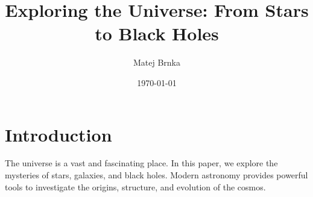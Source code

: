 \documentclass[11pt,a4paper]{article}
\title{Exploring the Universe: From Stars to Black Holes}
\author{Matej Brnka}
\date{\today}
\begin{document}
\maketitle
\section{Introduction}
The universe is a vast and fascinating place. In this paper, we explore the mysteries of stars, galaxies, and black holes. Modern astronomy provides powerful tools to investigate the origins, structure, and evolution of the cosmos.
\end{document}
